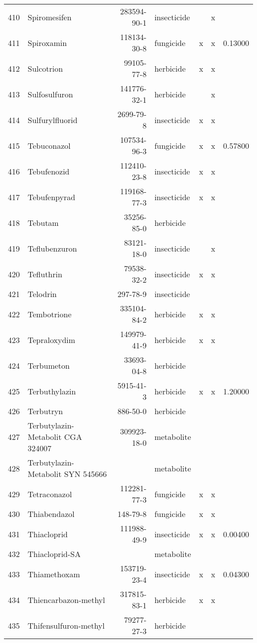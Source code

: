 \begin{longtable}{lp{4cm}rlp{1.3cm}p{1.3cm}p{1.5cm}}
  410 & Spiromesifen & 283594-90-1 & insecticide &  & x &  \\ 
  411 & Spiroxamin & 118134-30-8 & fungicide & x & x & 0.13000 \\ 
  412 & Sulcotrion & 99105-77-8 & herbicide & x & x &  \\ 
  413 & Sulfosulfuron & 141776-32-1 & herbicide &  & x &  \\ 
  414 & Sulfurylfluorid & 2699-79-8 & insecticide & x & x &  \\ 
  415 & Tebuconazol & 107534-96-3 & fungicide & x & x & 0.57800 \\ 
  416 & Tebufenozid & 112410-23-8 & insecticide & x & x &  \\ 
  417 & Tebufenpyrad & 119168-77-3 & insecticide & x & x &  \\ 
  418 & Tebutam & 35256-85-0 & herbicide &  &  &  \\ 
  419 & Teflubenzuron & 83121-18-0 & insecticide &  & x &  \\ 
  420 & Tefluthrin & 79538-32-2 & insecticide & x & x &  \\ 
  421 & Telodrin & 297-78-9 & insecticide &  &  &  \\ 
  422 & Tembotrione & 335104-84-2 & herbicide & x & x &  \\ 
  423 & Tepraloxydim & 149979-41-9 & herbicide & x & x &  \\ 
  424 & Terbumeton & 33693-04-8 & herbicide &  &  &  \\ 
  425 & Terbuthylazin & 5915-41-3 & herbicide & x & x & 1.20000 \\ 
  426 & Terbutryn & 886-50-0 & herbicide &  &  &  \\ 
  427 & Terbutylazin-Metabolit CGA 324007 & 309923-18-0 & metabolite &  &  &  \\ 
  428 & Terbutylazin-Metabolit SYN 545666 &  & metabolite &  &  &  \\ 
  429 & Tetraconazol & 112281-77-3 & fungicide & x & x &  \\ 
  430 & Thiabendazol & 148-79-8 & fungicide & x & x &  \\ 
  431 & Thiacloprid & 111988-49-9 & insecticide & x & x & 0.00400 \\ 
  432 & Thiacloprid-SA &  & metabolite &  &  &  \\ 
  433 & Thiamethoxam & 153719-23-4 & insecticide & x & x & 0.04300 \\ 
  434 & Thiencarbazon-methyl & 317815-83-1 & herbicide & x & x &  \\ 
  435 & Thifensulfuron-methyl & 79277-27-3 & herbicide &  &  &  \\ 

\end{longtable}
